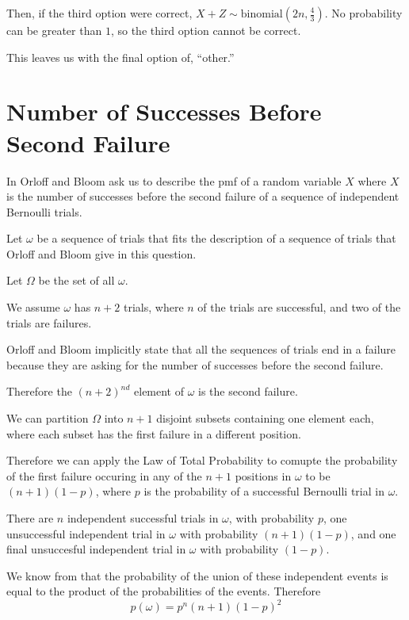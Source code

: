 \documentclass[a4paper,11pt]{article}
\begin{document}
Then, if the third option were correct, 
$X + Z \sim \text{binomial} \left( 2n, \frac{4}{3} \right)$.  No 
probability can be greater than $1$, so the third option cannot be
correct.

This leaves us with the final option of, ``other.''

\section{Number of Successes Before Second Failure}

In \cite{slides4} Orloff and Bloom ask us to describe the pmf
of a random variable $X$ where $X$ is the number of successes
before the second failure of a sequence of independent Bernoulli trials.

Let $\omega$ be a sequence of trials that fits the description of a
sequence of trials that Orloff and Bloom give in this question.

Let $\Omega$ be the set of all $\omega$.

We assume $\omega$ has $n+2$ trials, where $n$ of the trials are 
successful, and two of the trials are failures.

Orloff and Bloom implicitly state that all the sequences of trials
end in a failure because they are asking for the number of successes
before the second failure.

Therefore the $ \left( n+2 \right) ^ {nd} $ element of $\omega$ is the 
second failure.

We can partition $\Omega$ into $n+1$ disjoint subsets containing one
element each, where each subset has the first failure in a different
position.

Therefore we can apply the Law of Total Probability \cite{reading3} to
comupte the probability of the first failure occuring in any of the 
$n+1$  positions in $\omega$ to be 
$ \left( n + 1 \right) \left( 1 -  p \right)$, where $p$ is the 
probability of a successful Bernoulli trial in $\omega$.

There are $n$ independent successful trials in $\omega$, with
probability $p$, one unsuccessful independent trial in $\omega$ with 
probability $\left ( n + 1 \right) \left( 1 - p \right)$, and one final
unsuccesful independent trial in $\omega$ with probability 
$\left( 1 - p \right)$.

We know from \cite{reading3} that the probability of the union of these
independent events is equal to the product of the probabilities of the 
events.  Therefore 
\begin{equation}
p \left( \omega \right) 
  = p^{n}\left( n + 1 \right) \left( 1 - p \right)^{2}
\end{equation}
\end{document}
